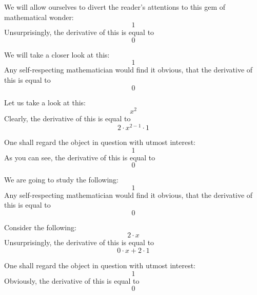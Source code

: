 \documentclass{article}
\begin{document}
We will allow ourselves to divert the reader's attentions to this gem of mathematical wonder:
\begin{equation}
1 
\end{equation}
Unsurprisingly, the derivative of this is equal to
\begin{equation}
0 
\end{equation}

We will take a closer look at this:
\begin{equation}
1 
\end{equation}
Any self-respecting mathematician would find it obvious, that the derivative of this is equal to
\begin{equation}
0 
\end{equation}

Let us take a look at this:
\begin{equation}
x ^{2 } 
\end{equation}
Clearly, the derivative of this is equal to
\begin{equation}
2 \cdot x ^{2 - 1 } \cdot 1 
\end{equation}

One shall regard the object in question with utmost interest:
\begin{equation}
1 
\end{equation}
As you can see, the derivative of this is equal to
\begin{equation}
0 
\end{equation}

We are going to study the following:
\begin{equation}
1 
\end{equation}
Any self-respecting mathematician would find it obvious, that the derivative of this is equal to
\begin{equation}
0 
\end{equation}

Consider the following:
\begin{equation}
2 \cdot x 
\end{equation}
Unsurprisingly, the derivative of this is equal to
\begin{equation}
0 \cdot x + 2 \cdot 1 
\end{equation}

One shall regard the object in question with utmost interest:
\begin{equation}
1 
\end{equation}
Obviously, the derivative of this is equal to
\begin{equation}
0 
\end{equation}
\end{document}
